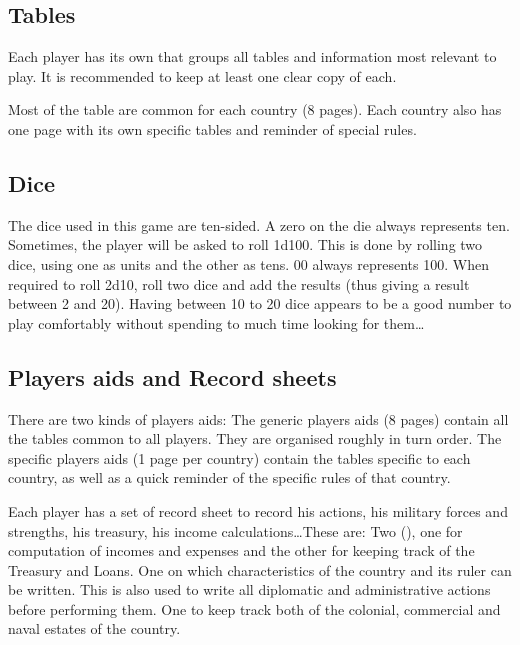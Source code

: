 \subsection{Tables}

\aparag Each player has its own  that groups all tables
and information most relevant to play. It is recommended to keep at least one
clear copy of each.

\aparag Most of the table are common for each country (8 pages). Each country
also has one page with its own specific tables and reminder of special rules.



\subsection{Dice}

\aparag The dice used in this game are ten-sided. A zero on the die always
represents ten.
\bparag Sometimes, the player will be asked to roll 1d100. This is done by
rolling two dice, using one as units and the other as tens. 00 always
represents 100.
\bparag When required to roll 2d10, roll two dice and add the results (thus
giving a result between 2 and 20).
\aparag Having between 10 to 20 dice appears to be a good number to play
comfortably without spending to much time looking for them\ldots



\subsection{Players aids and Record sheets}

 There are two kinds of players aids:
\bparag The generic players aids (8 pages) contain all the tables common to
all players. They are organised roughly in turn order.
\bparag The specific players aids (1 page per country) contain the tables
specific to each country, as well as a quick reminder of the specific rules of
that country.

 Each player has a set of record sheet to record
his actions, his military forces and strengths, his treasury, his income
calculations\ldots These are:
\bparag Two  (\EcoRS), one for computation of
incomes and expenses and the other for keeping track of the Treasury and
Loans.
\bparag One  on which characteristics of the country and
its ruler can be written. This is also used to write all diplomatic and
administrative actions before performing them.
\bparag One  to keep track both of the colonial,
commercial and naval estates of the country.

